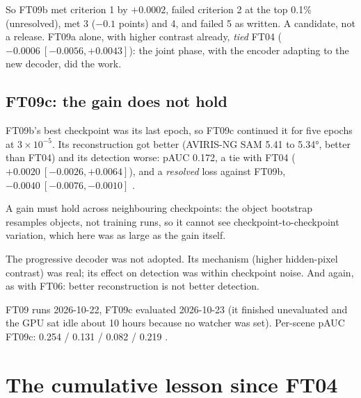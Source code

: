 So FT09b met criterion 1 by $+0.0002$, failed criterion 2 at the top 0.1\% (unresolved), met 3 ($-0.1$ points) and
4, and failed 5 as written. A candidate, not a release. FT09a alone, with higher contrast already, \emph{tied}
FT04 ($-0.0006\ [-0.0056,+0.0043]$): the joint phase, with the encoder adapting to the new decoder, did the work.

\subsection{FT09c: the gain does not hold}

FT09b's best checkpoint was its last epoch, so FT09c continued it for five epochs at $3\times10^{-5}$. Its
reconstruction got better (AVIRIS-NG SAM 5.41 to 5.34°, better than FT04) and its detection worse: pAUC 0.172, a
tie with FT04 ($+0.0020\ [-0.0026,+0.0064]$), and a \emph{resolved} loss against FT09b,
$-0.0040\ [-0.0076,-0.0010]$ .

\begin{keypoint}
A gain must hold across neighbouring checkpoints: the object bootstrap resamples objects, not training runs, so
it cannot see checkpoint-to-checkpoint variation, which here was as large as the gain itself.
\end{keypoint}

The progressive decoder was not adopted. Its mechanism (higher hidden-pixel contrast) was real; its effect on
detection was within checkpoint noise. And again, as with FT06: better reconstruction is not better detection.

\begin{drift}
FT09 runs 2026-10-22, FT09c evaluated 2026-10-23 (it finished unevaluated and the GPU sat idle about 10 hours
because no watcher was set). Per-scene pAUC FT09c: 0.254 / 0.131 / 0.082 / 0.219
.
\end{drift}

\section{The cumulative lesson since FT04}\label{sec:decoderwork:cumulative}


